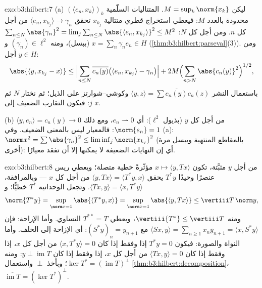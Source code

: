 \begin{solution}{exo:b3:hilbert:7}
(a) ليكن $M = \sup_k\norm{x_k}$. المتتاليات السلّمية $(\langle e_n, x_k\rangle)_k$ محدودة بالعدد $M$:
فيعطي استخراج قطري متتالية $x_{k_j}$ تحقق $\langle e_n, x_{k_j}\rangle
\to \gamma_n$ من أجل كل $n$.
ومن أجل كل $N$: $\sum_{n\leq
N}\abs{\gamma_n}^2 = \lim_j\sum_{n\leq N}\abs{\langle e_n,
x_{k_j}\rangle}^2 \leq M^2$ (ببسل)، ومنه $(\gamma_n) \in
\ell^2$ و $x = \sum_n\gamma_ne_n \in H$
(\cref{thm:b3:hilbert:parseval}(3)). ومن أجل $y \in H$:
\[
\abs{\langle y, x_{k_j} - x\rangle}
\leq \Bigl|\sum_{n\leq N}\overline{c_n(y)}\bigl(\langle e_n,
x_{k_j}\rangle - \gamma_n\bigr)\Bigr|
+ 2M\Bigl(\sum_{n>N}\abs{c_n(y)}^2\Bigr)^{1/2},
\]
باستعمال النشر $\langle y, z\rangle =
\sum\overline{c_n(y)}c_n(z)$ وكوشي--شوارتز على الذيل؛ ثم نختار $N$ ثم
$j$: فيكون التقارب الضعيف إلى $x$.

(b) $\langle y, e_n\rangle = c_n(y) \to 0$ من أجل كل $y$ (بذيول $\ell^2$): أي $e_n \rightharpoonup 0$، ومع ذلك
$\norm{e_n} =
1$: فالمعيار ليس  بالمعنى الضعيف. وفي (a): $\norm x^2 =
\sum\abs{\gamma_n}^2 \leq \liminf_j\norm{x_{k_j}}^2$
(بالمقاطع المنتهية وببسل مرة أخرى): أي إن النهايات الضعيفة لا
يمكنها إلا أن تفقد معيارًا.
\end{solution}

\begin{solution}{exo:b3:hilbert:8}
من أجل $y$ مثبَّتة، تكون $x \mapsto \langle y, Tx\rangle$ مؤثّرةً خطية متصلة؛ ويعطي ريس
عنصرًا وحيدًا $T^*y$ يحقق $\langle y, Tx\rangle = \langle T^*y, x\rangle$ من أجل كل $x$ --- وبالمرافقة،
$\langle Tx, y\rangle = \langle x,
T^*y\rangle$. وتجعل الوحدانية $T^*$ خطيًّا؛ و
\[
\norm{T^*y} = \sup_{\norm x = 1}\abs{\langle T^*y, x\rangle}
= \sup_{\norm x=1}\abs{\langle y, Tx\rangle}
\leq \vertiii T\,\norm y,
\]
ومنه $\vertiii{T^*} \leq \vertiii T$، ويعطي $T^{**} = T$ التساوي. وأما الإزاحة: فإن
$\langle Sx, y\rangle = \sum_{n\geq1}
x_n\bar y_{n+1} = \langle x, S^*y\rangle$ مع $(S^*y)_n =
y_{n+1}$: أي الإزاحة إلى الخلف. وأما النواة والصورة:
فيكون $T^*y = 0$ إذا وفقط إذا كان $\langle x, T^*y\rangle = 0$ من أجل كل $x$، إذا
وفقط إذا كان $\langle Tx,
y\rangle = 0$ من أجل كل $x$، إذا وفقط إذا كان $y \perp \operatorname{im}T$:
ومنه $\ker T^* = (\operatorname{im}T)^\perp$؛ وبأخذ $\perp$ واستعمال \cref{thm:b3:hilbert:decomposition}، $\overline{\operatorname{im}T} = (\ker T^*)^\perp$.
\end{solution}


